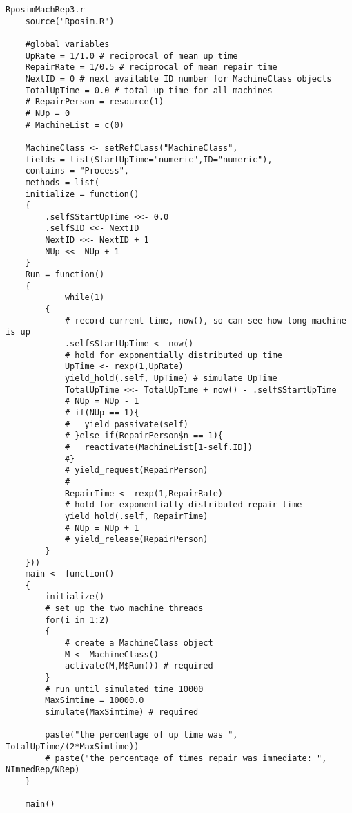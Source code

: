 \documentclass[titlepage]{article}
\begin{document}
\begin{verbatim}
RposimMachRep3.r
    source("Rposim.R")
    
    #global variables
    UpRate = 1/1.0 # reciprocal of mean up time
    RepairRate = 1/0.5 # reciprocal of mean repair time
    NextID = 0 # next available ID number for MachineClass objects
    TotalUpTime = 0.0 # total up time for all machines
    # RepairPerson = resource(1)
    # NUp = 0
    # MachineList = c(0)
    
    MachineClass <- setRefClass("MachineClass",
    fields = list(StartUpTime="numeric",ID="numeric"),
    contains = "Process",
    methods = list(
    initialize = function()
    {
        .self$StartUpTime <<- 0.0
        .self$ID <<- NextID
        NextID <<- NextID + 1
        NUp <<- NUp + 1
    }
    Run = function()
    {
            while(1)
        {  
            # record current time, now(), so can see how long machine is up
            .self$StartUpTime <- now()
            # hold for exponentially distributed up time
            UpTime <- rexp(1,UpRate)
            yield_hold(.self, UpTime) # simulate UpTime
            TotalUpTime <<- TotalUpTime + now() - .self$StartUpTime
            # NUp = NUp - 1
            # if(NUp == 1){
            #	yield_passivate(self)
            # }else if(RepairPerson$n == 1){
            #	reactivate(MachineList[1-self.ID])
            #}
            # yield_request(RepairPerson)
            # 
            RepairTime <- rexp(1,RepairRate)
            # hold for exponentially distributed repair time
            yield_hold(.self, RepairTime)
            # NUp = NUp + 1
            # yield_release(RepairPerson)
        }
    }))
    main <- function()
    {
        initialize()
        # set up the two machine threads
        for(i in 1:2)
        {
            # create a MachineClass object
            M <- MachineClass()
            activate(M,M$Run()) # required
        }
        # run until simulated time 10000
        MaxSimtime = 10000.0
        simulate(MaxSimtime) # required

        paste("the percentage of up time was ", TotalUpTime/(2*MaxSimtime))
        # paste("the percentage of times repair was immediate: ", NImmedRep/NRep)
    }

    main()
\end{verbatim}

\clearpage
\end{document}
